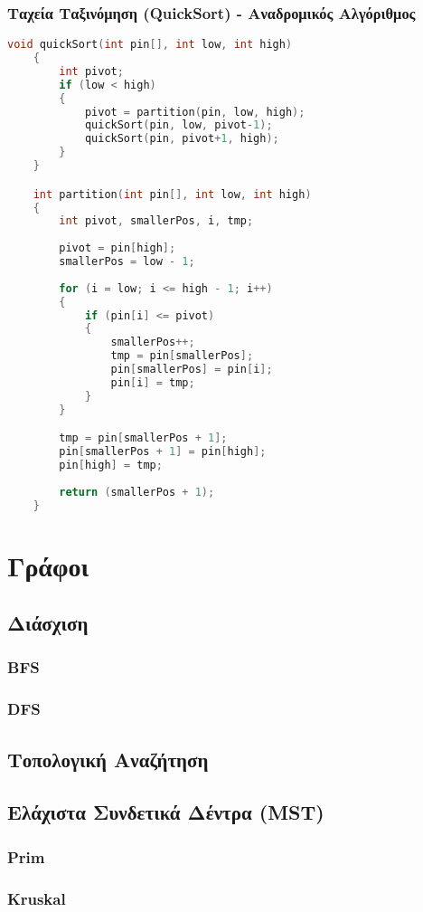 \documentclass[a4paper,12pt]{article}
\begin{document}
\subsubsection{Ταχεία Ταξινόμηση \textbf{(QuickSort)} - Αναδρομικός Αλγόριθμος}
\begin{lstlisting}[language=c]
    void quickSort(int pin[], int low, int high)
    {
        int pivot;
        if (low < high)
        {
            pivot = partition(pin, low, high);
            quickSort(pin, low, pivot-1);
            quickSort(pin, pivot+1, high);
        }
    }

    int partition(int pin[], int low, int high)
    {
        int pivot, smallerPos, i, tmp;
        
        pivot = pin[high];
        smallerPos = low - 1;
        
        for (i = low; i <= high - 1; i++)
        {
            if (pin[i] <= pivot)
            {
                smallerPos++;
                tmp = pin[smallerPos];
                pin[smallerPos] = pin[i];
                pin[i] = tmp;
            }
        }        

        tmp = pin[smallerPos + 1];
        pin[smallerPos + 1] = pin[high];
        pin[high] = tmp;
        
        return (smallerPos + 1);
    }
\end{lstlisting}

\newpage
\section{Γράφοι}
\subsection{Διάσχιση}
\subsubsection{BFS}
\subsubsection{DFS}
\subsection{Τοπολογική Αναζήτηση}
\subsection{Ελάχιστα Συνδετικά Δέντρα (MST)}
\subsubsection{Prim}
\subsubsection{Kruskal}
\end{document}
